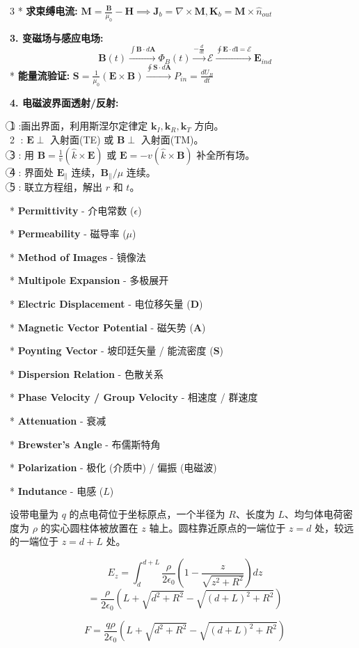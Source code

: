 \documentclass[10pt,a4paper,landscape,utf8]{ctexart}
\newcommand{\bs}[1]{\boldsymbol{#1}}
\begin{document}
\begin{multicols*}{3}
* \textbf{求束缚电流:} $\bs{M} = \frac{\bs{B}}{\mu_0} - \bs{H} \implies \bs{J}_b = \nabla\times\bs{M}, \bs{K}_b = \bs{M}\times\hat{n}_{out}$

\textbf{3. 变磁场与感应电场:}
$$ \bs{B}(t) \xrightarrow{\int \bs{B}\cdot d\bs{A}} \Phi_B(t) \xrightarrow{-\frac{d}{dt}} \mathcal{E} \xrightarrow{\oint \bs{E}\cdot d\bs{l} = \mathcal{E}} \bs{E}_{ind} $$
* \textbf{能量流验证:} $\bs{S} = \frac{1}{\mu_0}(\bs{E}\times\bs{B}) \xrightarrow{\oint \bs{S}\cdot d\bs{A}} P_{in} = \frac{dU_B}{dt}$

\textbf{4. 电磁波界面透射/反射:}

\textcircled{1} :画出界面，利用斯涅尔定律定 $\bs{k}_I, \bs{k}_R, \bs{k}_T$ 方向。\\
\textcircled{2} : $\bs{E} \perp$ 入射面(TE) 或 $\bs{B} \perp$ 入射面(TM)。\\
\textcircled{3} : 用 $\bs{B} = \frac{1}{v}(\hat{k}\times\bs{E})$ 或 $\bs{E} = -v(\hat{k}\times\bs{B})$ 补全所有场。\\
\textcircled{4} : 界面处 $\bs{E}_{\parallel}$ 连续，$\bs{B}_{\parallel}/\mu$ 连续。\\
\textcircled{5} : 联立方程组，解出 $r$ 和 $t$。

* \textbf{Permittivity} - 介电常数 ($\epsilon$)

* \textbf{Permeability} - 磁导率 ($\mu$)

* \textbf{Method of Images} - 镜像法

* \textbf{Multipole Expansion} - 多极展开

* \textbf{Electric Displacement} - 电位移矢量 ($\bs{D}$)

* \textbf{Magnetic Vector Potential} - 磁矢势 ($\bs{A}$)

* \textbf{Poynting Vector} - 坡印廷矢量 / 能流密度 ($\bs{S}$)

* \textbf{Dispersion Relation} - 色散关系

* \textbf{Phase Velocity / Group Velocity} - 相速度 / 群速度

* \textbf{Attenuation} - 衰减

* \textbf{Brewster's Angle} - 布儒斯特角

* \textbf{Polarization} - 极化 (介质中) / 偏振 (电磁波)

* \textbf{Indutance} - 电感 ($L$)


设带电量为 $q$ 的点电荷位于坐标原点，一个半径为 $R$、长度为 $L$、均匀体电荷密度为 $\rho$ 的实心圆柱体被放置在 $z$ 轴上。圆柱靠近原点的一端位于 $z=d$ 处，较远的一端位于 $z=d+L$ 处。

$$ E_z = \int_d^{d+L} \frac{\rho}{2\epsilon_0} \left( 1 - \frac{z}{\sqrt{z^2 + R^2}} \right) dz $$
$$= \frac{\rho}{2\epsilon_0} \left( L + \sqrt{d^2 + R^2} - \sqrt{(d+L)^2 + R^2} \right) $$

$$ F = \frac{q \rho}{2\epsilon_0} \left( L + \sqrt{d^2 + R^2} - \sqrt{(d+L)^2 + R^2} \right) $$
\end{multicols*}
\end{document}
